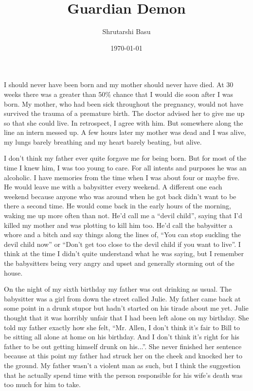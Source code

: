\documentclass[12pt,letterpaper]{article}
\title{Guardian Demon}
\author{Shrutarshi Basu}
\date{\today}
\begin{document}
\maketitle
\doublespacing

I should never have been born and my mother should never have died. At 30 weeks there was a greater than 50\% chance that I would die soon after I was born. My mother, who had been sick throughout the pregnancy, would not have survived the trauma of a premature birth. The doctor advised her to give me up so that she could live. In retrospect, I agree with him. But somewhere along the line an intern messed up. A few hours later my mother was dead and I was alive, my lungs barely breathing and my heart barely beating, but alive.

I don't think my father ever quite forgave me for being born. But for most of the time I knew him, I was too young to care. For all intents and purposes he was an alcoholic. I have memories from the time when I was about four or maybe five. He would leave me with a babysitter every weekend. A different one each weekend because anyone who was around when he got back didn't want to be there a second time. He would come back in the early hours of the morning, waking me up more often than not. He'd call me a ``devil child'', saying that I'd killed my mother and was plotting to kill him too. He'd call the babysitter a whore and a bitch and say things along the lines of, ``You can stop suckling the devil child now'' or ``Don't get too close to the devil child if you want to live''. I think at the time I didn't quite understand what he was saying, but I remember the babysitters being very angry and upset and generally storming out of the house.

On the night of my sixth birthday my father was out drinking as usual. The babysitter was a girl from down the street called Julie. My father came back at some point in a drunk stupor but hadn't started on his tirade about me yet. Julie thought that it was horribly unfair that I had been left alone on my birthday. She told my father exactly how she felt, ``Mr. Allen, I don't think it's fair to Bill to be sitting all alone at home on his birthday. And I don't think it's right for his father to be out getting himself drunk on his...''. She never finished her sentence because at this point my father had struck her on the cheek and knocked her to the ground. My father wasn't a violent man as such, but I think the suggestion that he actually spend time with the person responsible for his wife's death was too much for him to take.
\end{document}
